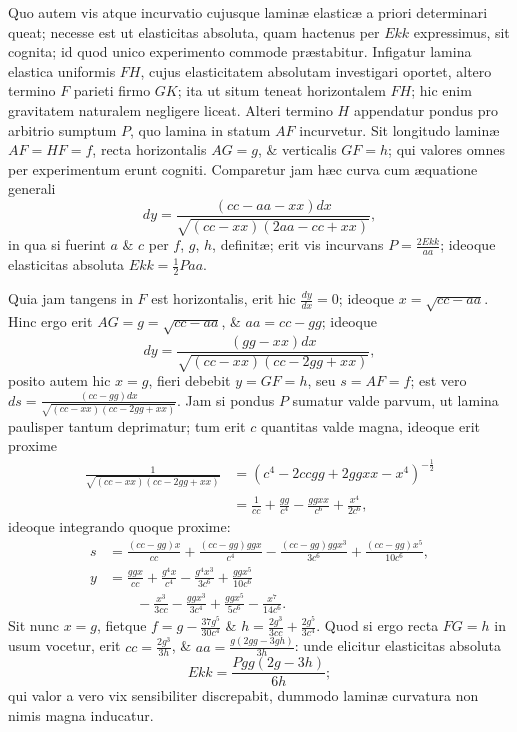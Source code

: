 Quo autem vis atque incurvatio cujusque laminæ elasticæ a priori determinari queat; necesse est ut elasticitas absoluta, quam hactenus per $Ekk$ expressimus, sit cognita; id quod unico experimento commode præstabitur. Infigatur lamina elastica uniformis $FH$, cujus elasticitatem absolutam investigari oportet, altero termino $F$ parieti firmo $GK$; ita ut situm teneat horizontalem $FH$; hic enim gravitatem naturalem negligere liceat. Alteri termino $H$ appendatur pondus pro arbitrio sumptum $P$, quo lamina in statum $AF$ incurvetur. Sit longitudo laminæ $AF=HF=f$, recta horizontalis $AG=g$, \& verticalis $GF=h$; qui valores omnes per experimentum erunt cogniti. Comparetur jam hæc curva cum æquatione generali
\[dy=\frac{(cc-aa-xx)dx}{\sqrt{(cc-xx)(2aa-cc+xx)}},\]
in qua si fuerint $a$ \& $c$ per $f$, $g$, $h$, definitæ; erit vis incurvans $P=\frac{2Ekk}{aa}$; ideoque elasticitas absoluta $Ekk=\frac12Paa$.

Quia jam tangens in $F$ est horizontalis, erit hic $\frac{dy}{dx}=0$; ideoque $x=\sqrt{cc-aa}$. Hinc ergo erit $AG=g=\sqrt{cc-aa}$, \& $aa=cc-gg$; ideoque
\[dy=\frac{(gg-xx)dx}{\sqrt{(cc-xx)(cc-2gg+xx)}},\]
posito autem hic $x=g$, fieri debebit $y=GF=h$, seu $s=AF=f$; est vero $ds=\frac{(cc-gg)dx}{\sqrt{(cc-xx)(cc-2gg+xx)}}$. Jam si pondus $P$ sumatur valde parvum, ut lamina paulisper
tantum deprimatur; tum erit $c$ quantitas valde magna, ideoque erit proxime
\[\begin{aligned}
\frac1{\sqrt{(cc-xx)(cc-2gg+xx)}}&=(c^4-2ccgg+2ggxx-x^4)^{-\frac12}\\
&=\frac1{cc}+\frac{gg}{c^4}-\frac{ggxx}{c^6}+\frac{x^4}{2c^6},
\end{aligned}\]
ideoque integrando quoque proxime:
\[\begin{aligned}
s&=\frac{(cc-gg)x}{cc}+\frac{(cc-gg)ggx}{c^4}-\frac{(cc-gg)ggx^3}{3c^6}+\frac{(cc-gg)x^5}{10c^6},\\
y&=\frac{ggx}{cc}+\frac{g^4x}{c^4}-\frac{g^4x^3}{3c^6}+\frac{ggx^5}{10c^6}\\
&\qquad-\frac{x^3}{3cc}-\frac{ggx^3}{3c^4}+\frac{ggx^5}{5c^6}-\frac{x^7}{14c^6}.
\end{aligned}\]
Sit nunc $x=g$, fietque $f=g-\frac{37g^5}{30c^4}$ \& $h=\frac{2g^3}{3cc}+\frac{2g^5}{3c^4}$. Quod si ergo recta $FG=h$ in usum vocetur, erit $cc=\frac{2g^3}{3h}$, \& $aa=\frac{g(2gg-3gh)}{3h}$: unde elicitur elasticitas absoluta
\[Ekk=\frac{Pgg(2g-3h)}{6h};\]
qui valor a vero vix sensibiliter discrepabit, dummodo laminæ curvatura non nimis magna inducatur.

